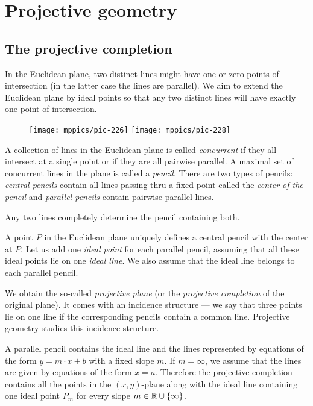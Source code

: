 \chapter{Projective geometry}\label{chap:proj}

\section{The projective completion}

In the Euclidean plane, two distinct lines might have one or zero points of intersection 
(in the latter case the lines are parallel).
We aim to extend the Euclidean plane by ideal points so that any two distinct lines will have exactly one point of intersection.

\begin{wrapfigure}{o}{31mm}
\centering
\texttt{[image: mppics/pic-226]}
\vskip4mm
\texttt{[image: mppics/pic-228]}
\end{wrapfigure}

A collection of lines in the Euclidean plane is called \emph{concurrent} if they all intersect at a single point 
or if they are all pairwise parallel.
A maximal set of concurrent lines in the plane is called a \emph{pencil}.
There are two types of pencils: 
\emph{central pencils} contain all lines passing thru a fixed point called the \emph{center of the pencil}
and  
\emph{parallel pencils} contain pairwise parallel lines.

Any two lines completely determine the pencil containing both.

A point $P$ in the Euclidean plane uniquely defines a central pencil with the center at $P$.
Let us add one \emph{ideal point} for each parallel pencil,
assuming that all these ideal points lie on one \emph{ideal line}.
We also assume that the ideal line belongs to each parallel pencil.

We obtain the so-called \emph{projective plane} (or  the \emph{projective completion} of the original plane). 
It comes with an incidence structure --- we say that three points lie on one line if the corresponding pencils contain a common line.
Projective geometry studies this incidence structure.

A parallel pencil contains the ideal line and the lines represented by equations of the form $y=m\cdot x+b$ with a fixed slope $m$.
If $m=\infty$, we assume that the lines are given by equations of the form $x=a$.
Therefore the projective completion contains all the points in the $(x,y)$-plane along with the ideal line containing one ideal point $P_m$ for every slope $m\in\mathbb{R}\cup\{\infty\}$.

